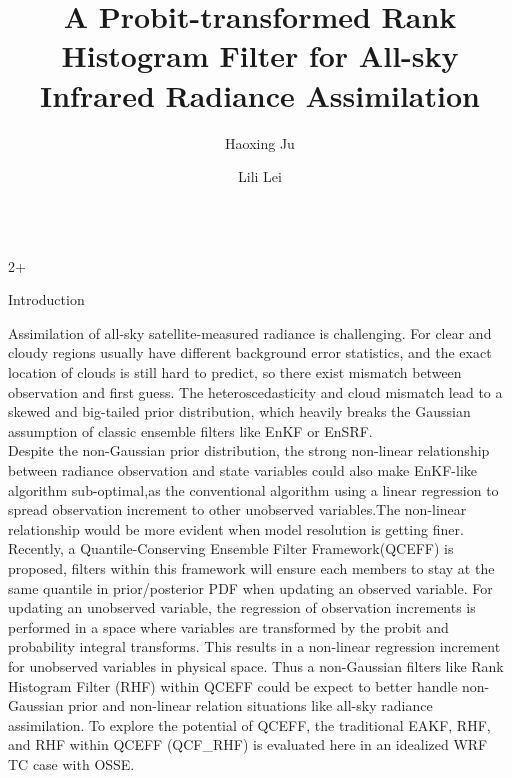 \documentclass[final]{beamer}
\title{A Probit-transformed Rank Histogram Filter for All-sky Infrared Radiance Assimilation}
\author{Haoxing Ju \inst{1} \inst{2} \and Lili Lei \inst{1} \inst{2}}
\institute[shortinst]{\inst{1} Key Laboratory of Mesoscale Severe Weather, Ministry of Education, Nanjing University, Nanjing, China \samelineand \inst{2} School of Atmospheric Sciences, Nanjing University, Nanjing, China}
\newlength{\sepwidth}
\newlength{\colwidth}
\begin{document}
\begin{frame}[t]
	\begin{columns}
    	\begin{column}{2\colwidth+\sepwidth}
    	\begin{block}{Introduction}
    		 
    		Assimilation of all-sky satellite-measured radiance is challenging. For clear and cloudy regions usually have different background error statistics, and the exact location of clouds is still hard to predict, so there exist mismatch between observation and first guess. The heteroscedasticity and cloud mismatch lead to a skewed and big-tailed prior distribution, which heavily breaks the Gaussian assumption of classic ensemble filters like EnKF or EnSRF. \\
            \vspace{0.5cm}
            Despite the non-Gaussian prior distribution, the strong non-linear relationship between radiance observation and state variables could also make EnKF-like algorithm sub-optimal,as the conventional algorithm using a linear regression to spread observation increment to other unobserved variables.The non-linear relationship would be more evident when model resolution is getting finer. \\
            \vspace{0.5cm}
            Recently, a Quantile-Conserving Ensemble Filter Framework(QCEFF) is proposed, filters within this framework will ensure each members to stay at the same quantile in prior/posterior PDF when updating an observed variable\parencite{Jeff_2022}. For updating an unobserved variable, the regression of observation increments is performed in a space where variables are transformed by the probit and probability integral transforms\parencite{Jeff_2023}. This results in a non-linear regression increment for unobserved variables in physical space. Thus a non-Gaussian filters like Rank Histogram Filter (RHF) within QCEFF could be expect to better handle non-Gaussian prior and non-linear relation situations like all-sky radiance assimilation. To explore the potential of QCEFF, the traditional EAKF, RHF, and RHF within QCEFF (QCF\_RHF) is evaluated here in an idealized WRF TC case with OSSE. 
    		
    	\end{block}
    	\end{column}

	\end{columns}


\end{frame}
\end{document}
